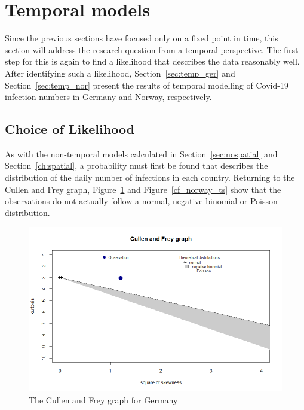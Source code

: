 \section{Temporal models}\label{sec:temporal}
Since the previous sections have focused only on a fixed point in time, this section will address the research question from a temporal perspective. The first step for this is again to find a likelihood that describes the data reasonably well. After identifying such a likelihood, Section~\ref{sec:temp_ger} and Section~\ref{sec:temp_nor} present the results of temporal modelling of Covid-19 infection numbers in Germany and Norway, respectively.
\subsection{Choice of Likelihood}
As with the non-temporal models calculated in Section~\ref{sec:nospatial} and Section~\ref{ch:spatial}, a probability must first be found that describes the distribution of the daily number of infections in each country. Returning to the Cullen and Frey graph, Figure~\ref{cf_germany_ts} and Figure~\ref{cf_norway_ts} show that the observations do not actually follow a normal, negative binomial or Poisson distribution.
\begin{figure}[H]
  \centering
  \includegraphics[width = \textwidth]{cf_germany_ts.png}
  \caption{The Cullen and Frey graph for Germany}
  \label{cf_germany_ts}
\end{figure}
